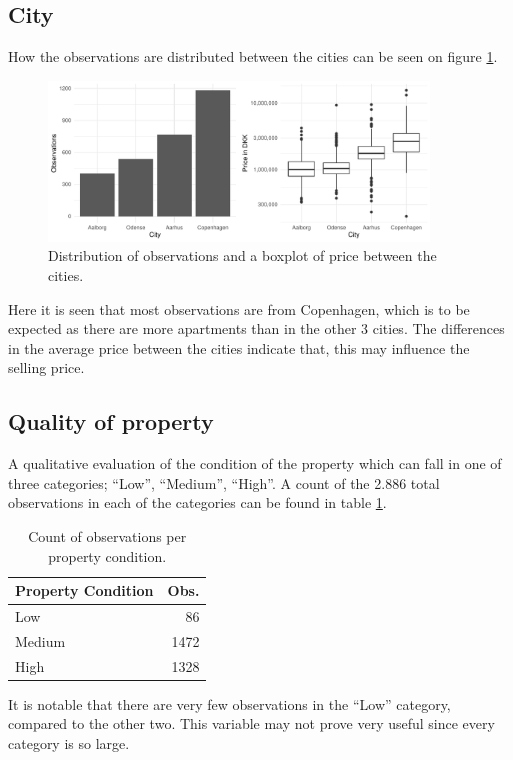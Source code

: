 \subsection*{City}
How the observations are distributed between the cities can be seen on figure \ref{fig:distributions_between_cities}.
\begin{figure}[H]
    \centering
    \includegraphics[width=0.9\textwidth]{figures/Data_introduction/distribution_between_cities.pdf}
    \caption{Distribution of observations and a boxplot of price between the cities.}
    \label{fig:distributions_between_cities}
\end{figure}
Here it is seen that most observations are from Copenhagen, which is to be expected as there are more apartments than in the other 3 cities.
The differences in the average price between the cities indicate that, this may influence the selling price.

\subsection*{Quality of property}
A qualitative evaluation of the condition of the property which can fall in one of three categories; ``Low'', ``Medium'', ``High''.
A count of the 2.886 total observations in each of the categories can be found in table \ref{tbl:property_condition}.
\begin{table}[H]
    \centering
    \begin{tabular}{lr}
        \toprule
        \textbf{Property Condition} & \textbf{Obs.}\\
        \midrule
        Low & 86\\
        Medium & 1472\\
        High & 1328\\
        \bottomrule
    \end{tabular}
    \caption{Count of observations per property condition.}
    \label{tbl:property_condition}
\end{table}
It is notable that there are very few observations in the ``Low'' category, compared to the other two. 
This variable may not prove very useful since every category is so large.

